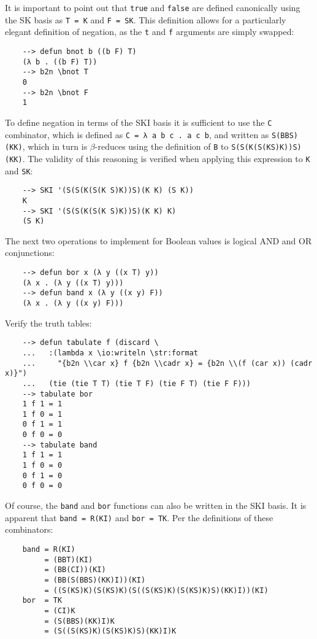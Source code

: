 It is important to point out that \verb|true| and \verb|false| are defined canonically using the SK basis as \verb|T = K| and \verb|F = SK|. This definition allows for a particularly elegant definition of negation, as the \verb|t| and \verb|f| arguments are simply swapped:

\begin{Verbatim}
    --> defun bnot b ((b F) T)
    (λ b . ((b F) T))
    --> b2n \bnot T
    0
    --> b2n \bnot F
    1
\end{Verbatim}

To define negation in terms of the SKI basis it is sufficient to use the \verb|C| combinator, which is defined as \verb|C = λ a b c . a c b|, and written as \verb|S(BBS)(KK)|, which in turn is $\beta$-reduces using the definition of \verb|B| to \verb|S(S(K(S(KS)K))S)(KK)|. The validity of this reasoning is verified when applying this expression to \verb|K| and \verb|SK|:

\begin{Verbatim}
    --> SKI '(S(S(K(S(K S)K))S)(K K) (S K))
    K
    --> SKI '(S(S(K(S(K S)K))S)(K K) K)
    (S K)
\end{Verbatim}

The next two operations to implement for Boolean values is logical AND and OR conjunctions:

\begin{Verbatim}
    --> defun bor x (λ y ((x T) y))
    (λ x . (λ y ((x T) y)))
    --> defun band x (λ y ((x y) F))
    (λ x . (λ y ((x y) F)))
\end{Verbatim}

Verify the truth tables:

\begin{Verbatim}
    --> defun tabulate f (discard \
    ...   :(lambda x \io:writeln \str:format
    ...     "{b2n \\car x} f {b2n \\cadr x} = {b2n \\(f (car x)) (cadr x)}")
    ...   (tie (tie T T) (tie T F) (tie F T) (tie F F)))
    --> tabulate bor
    1 f 1 = 1
    1 f 0 = 1
    0 f 1 = 1
    0 f 0 = 0
    --> tabulate band
    1 f 1 = 1
    1 f 0 = 0
    0 f 1 = 0
    0 f 0 = 0
\end{Verbatim}

Of course, the \verb|band| and \verb|bor| functions can also be written in the SKI basis. It is apparent that \verb|band = R(KI)| and \verb|bor = TK|. Per the definitions of these combinators:

\begin{Verbatim}
    band = R(KI)
         = (BBT)(KI)
         = (BB(CI))(KI)
         = (BB(S(BBS)(KK)I))(KI)
         = ((S(KS)K)(S(KS)K)(S((S(KS)K)(S(KS)K)S)(KK)I))(KI)
    bor  = TK
         = (CI)K
         = (S(BBS)(KK)I)K
         = (S((S(KS)K)(S(KS)K)S)(KK)I)K
\end{Verbatim}

